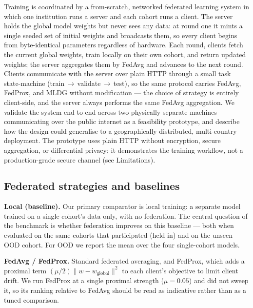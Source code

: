 \documentclass[10pt,letterpaper]{article}
\begin{document}
Training is coordinated by a from-scratch, networked federated learning system
in which one institution runs a server and each cohort runs a client. The server
holds the global model weights but never sees any data: at round one it mints a
single seeded set of initial weights and broadcasts them, so every client begins
from byte-identical parameters regardless of hardware. Each round, clients fetch
the current global weights, train locally on their own cohort, and return updated
weights; the server aggregates them by FedAvg and advances to the next round.
Clients communicate with the server over plain HTTP through a small task
state-machine (train\,$\rightarrow$\,validate\,$\rightarrow$\,test), so the same
protocol carries FedAvg, FedProx, and MLDG without modification --- the choice of
strategy is entirely client-side, and the server always performs the same FedAvg
aggregation. We validate the system end-to-end across two physically separate
machines communicating over the public internet as a feasibility prototype, and
describe how the design could generalise to a geographically distributed,
multi-country deployment. The prototype uses plain HTTP without encryption,
secure aggregation, or differential privacy; it demonstrates the training
workflow, not a production-grade secure channel (see Limitations).

\subsection*{Federated strategies and baselines}

\textbf{Local (baseline).} Our primary comparator is local training: a separate
model trained on a single cohort's data only, with no federation. The central
question of the benchmark is whether federation improves on this baseline ---
both when evaluated on the same cohorts that participated (held-in) and on the
unseen OOD cohort. For OOD we report the mean over the four single-cohort models.

\textbf{FedAvg / FedProx.} Standard federated averaging, and FedProx, which adds
a proximal term $(\mu/2)\lVert w - w_{\text{global}}\rVert^2$ to each client's
objective to limit client drift. We run FedProx at a single proximal strength
($\mu=0.05$) and did not sweep it, so its ranking relative to FedAvg should be
read as indicative rather than as a tuned comparison.
\end{document}
